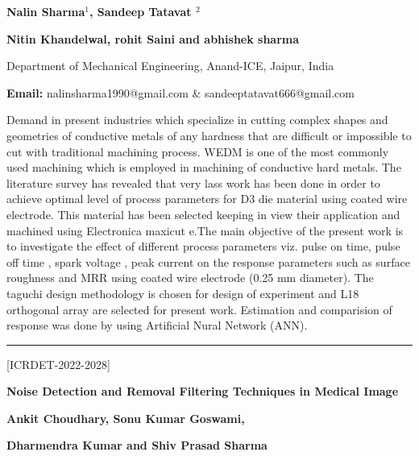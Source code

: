 \documentclass[twoside,11pt]{amsart}
\begin{document}
\centerline{\textbf{Nalin Sharma$^{1}$, Sandeep Tatavat
$^{2}$ }}
\centerline{ \textbf{  Nitin Khandelwal, rohit Saini and abhishek sharma           }}
\vskip 5mm
\begin{flushleft}
Department of Mechanical Engineering, Anand-ICE, Jaipur, India
\vskip 5mm
\end{flushleft}
\vskip 2mm
\begin{flushleft}
{\bf Email:} nalinsharma1990@gmail.com \& sandeeptatavat666@gmail.com
\end{flushleft}
\vskip 5mm
Demand in present industries which specialize in cutting complex shapes and geometries of conductive metals of any hardness that are difficult or impossible to cut with traditional machining process.
\vskip 2mm
\newpage
\vskip 3mm
WEDM is one of the most commonly used machining which is employed in machining of conductive hard metals. The literature survey has revealed that very lass work has been done in order to achieve optimal level of process parameters for D3 die material using coated wire electrode. This material has been selected keeping in view their application and machined using Electronica maxicut e.The main objective of the present work is to investigate the effect of different process parameters viz. pulse on time, pulse off time , spark voltage , peak current on the response parameters such as surface roughness and MRR using coated wire electrode (0.25 mm diameter). The taguchi design methodology is chosen for design of experiment and L18 orthogonal array are selected for present work. Estimation and comparision of response was done by using Artificial Nural Network (ANN).
\vskip 2mm
\rule{\textwidth}{0.5pt}
\vskip 5mm
\begin{flushleft}
\centerline{[ICRDET-2022-2028]}
\end{flushleft}
\begin{center}\bf\LARGE
Noise Detection and Removal Filtering Techniques in Medical Image
\end{center}
\vskip 5mm

\centerline{\textbf{Ankit Choudhary, Sonu Kumar Goswami,}}
\centerline{ \textbf{   Dharmendra Kumar and Shiv Prasad Sharma}}
\end{document}
